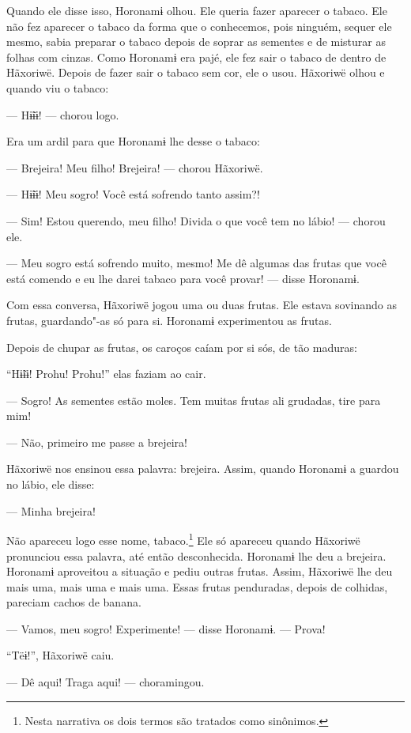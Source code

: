 Quando ele disse isso, Horonamɨ olhou. Ele queria fazer aparecer o
tabaco. Ele não fez aparecer o tabaco da forma que o conhecemos, pois
ninguém, sequer ele mesmo, sabia preparar o tabaco depois de soprar as
sementes e de misturar as folhas com cinzas. Como Horonamɨ era pajé, ele
fez sair o tabaco de dentro de Hãxoriwë. Depois de fazer sair o tabaco
sem cor, ele o usou. Hãxoriwë olhou e quando viu o tabaco: 

--- Hɨ̃ɨɨ! --- chorou logo. 

Era um ardil para que Horonamɨ lhe desse o tabaco: 

--- Brejeira! Meu filho! Brejeira! --- chorou Hãxoriwë. 

--- Hɨ̃ɨɨ! Meu sogro! Você está sofrendo tanto assim?! 

--- Sim! Estou querendo, meu filho! Divida o que você tem no
lábio! --- chorou ele.

--- Meu sogro está sofrendo muito, mesmo! Me dê algumas das frutas que
você está comendo e eu lhe darei tabaco para você provar! --- disse
Horonamɨ. 

Com essa conversa, Hãxoriwë jogou uma ou duas frutas. Ele estava
sovinando as frutas, guardando"-as só para si. Horonamɨ experimentou as
frutas. 

Depois de chupar as frutas, os caroços caíam por si sós, de tão maduras:

``Hɨ̃ɨɨ! Prohu! Prohu!'' elas faziam ao cair. 

--- Sogro! As sementes estão moles. Tem muitas frutas ali grudadas, tire
para mim! 

--- Não, primeiro me passe a brejeira! 

Hãxoriwë nos ensinou essa palavra: brejeira. Assim, quando Horonamɨ a
guardou no lábio, ele disse: 

--- Minha brejeira! 

Não apareceu logo esse nome, tabaco.\footnote{  Nesta narrativa os dois termos são tratados como sinônimos.}  Ele só apareceu
quando Hãxoriwë pronunciou essa palavra, até então desconhecida.
Horonamɨ lhe deu a brejeira. Horonamɨ aproveitou a situação e pediu
outras frutas. Assim, Hãxoriwë lhe deu mais uma, mais uma e mais uma.
Essas frutas penduradas, depois de colhidas, pareciam cachos de banana. 

--- Vamos, meu sogro! Experimente! --- disse Horonamɨ. --- Prova!

``Tëɨ!'', Hãxoriwë caiu. 

--- Dê aqui! Traga aqui! --- choramingou. 

